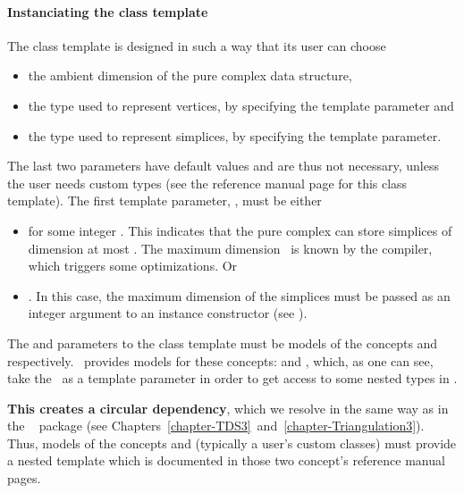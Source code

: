 {{\paragraph{Instanciating the class template}

The 
class template is designed in such a way that its user can choose
\begin{itemize}
\item the ambient dimension of the pure complex data structure,
\item the type used to represent vertices, by specifying the 
template parameter and
\item the type used to represent simplices, by specifying the
 template parameter.
\end{itemize}

The last two parameters have default values and are thus not necessary, unless
the user needs custom types (see the reference manual page for this class
template). The first template parameter, , must be either
\begin{itemize}
\item \ccPureGlobalScope{} for some integer \ad. This
indicates that the pure complex can store simplices of dimension at most
\ad. The maximum dimension \ad\ is known by the compiler, which
triggers some optimizations. Or
\item \ccPureGlobalScope{}. In this case, the maximum
dimension of the simplices must be passed as an integer argument to an instance
constructor (see ).
\end{itemize}

The  and  parameters to the class template
must be models of the concepts  and
 respectively. \cgal\ provides models for these
concepts:  and
, which, as one
can see, take the \tds\ as a template parameter in order to get access to
some nested types in \tds.

\textbf{This creates a circular dependency}, which we resolve in the same way
as in the \cgal\  package (see
Chapters~\ref{chapter-TDS3}~and~\ref{chapter-Triangulation3}).
 Thus, models of
the concepts  and
 (typically a
user's custom classes) must provide a nested template  which
is documented in those two concept's reference manual pages.

}}
